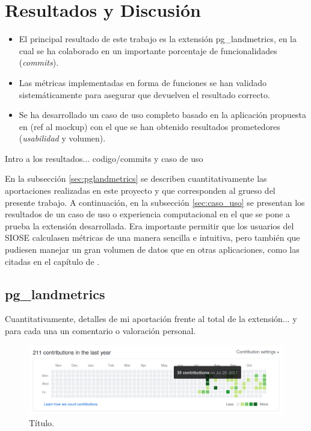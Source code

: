 \chapter{Resultados y Discusión}\label{chap:result}

\begin{graybox}
\begin{itemize}
\item El principal resultado de este trabajo es la extensión pg\_landmetrics, en la cual se ha colaborado en un importante porcentaje de funcionalidades (\textit{commits}).
\item Las métricas implementadas en forma de funciones se han validado sistemáticamente para asegurar que devuelven el resultado correcto.
\item Se ha desarrollado un caso de uso completo basado en la aplicación propuesta en (ref al mockup) con el que se han obtenido resultados prometedores (\textit{usabilidad} y volumen).
\end{itemize}
\end{graybox}

Intro a los resultados... codigo/commits y caso de uso

En la subsección \ref{sec:pglandmetrics} se describen cuantitativamente las aportaciones realizadas en este proyecto y que corresponden al grueso del presente trabajo. A continuación, en la subsección \ref{sec:caso_uso} se presentan los resultados de un caso de uso o experiencia computacional en el que se pone a prueba la extensión desarrollada. Era importante permitir que los usuarios del SIOSE calculasen métricas de una manera sencilla e intuitiva, pero también que pudiesen manejar un gran volumen de datos que en otras aplicaciones, como las citadas en el capítulo de .

\section{pg\_landmetrics \label{sec:pglandmetrics}}

Cuantitativamente, detalles de mi aportación frente al total de la extensión... y para cada una un comentario o valoración personal.

\begin{figure}
\begin{center}
\includegraphics[width=\textwidth]{ResultadosyDiscusion/Figs/contributions.png}
\caption{Título. \label{fig:contrib}}
\end{center}
\end{figure}

